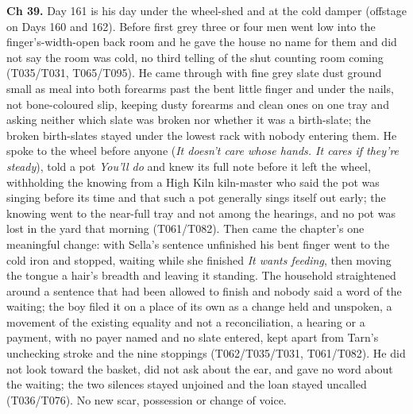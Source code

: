 \documentclass{design/chronicle}
\begin{document}
{\textbf{Ch 39.} Day 161 is his day under the wheel-shed and at the cold damper (offstage on Days 160 and 162). Before first grey three or four men went low into the finger’s-width-open back room and he gave the house no name for them and did not say the room was cold, no third telling of the shut counting room coming (T035/T031, T065/T095). He came through with fine grey slate dust ground small as meal into both forearms past the bent little finger and under the nails, not bone-coloured slip, keeping dusty forearms and clean ones on one tray and asking neither which slate was broken nor whether it was a birth-slate; the broken birth-slates stayed under the lowest rack with nobody entering them. He spoke to the wheel before anyone (\emph{It doesn’t care whose hands. It cares if they’re steady}), told a pot \emph{You’ll do} and knew its full note before it left the wheel, withholding the knowing from a High Kiln kiln-master who said the pot was singing before its time and that such a pot generally sings itself out early; the knowing went to the near-full tray and not among the hearings, and no pot was lost in the yard that morning (T061/T082). Then came the chapter’s one meaningful change: with Sella’s sentence unfinished his bent finger went to the cold iron and stopped, waiting while she finished \emph{It wants feeding}, then moving the tongue a hair’s breadth and leaving it standing. The household straightened around a sentence that had been allowed to finish and nobody said a word of the waiting; the boy filed it on a place of its own as a change held and unspoken, a movement of the existing equality and not a reconciliation, a hearing or a payment, with no payer named and no slate entered, kept apart from Tarn’s unchecking stroke and the nine stoppings (T062/T035/T031, T061/T082). He did not look toward the basket, did not ask about the ear, and gave no word about the waiting; the two silences stayed unjoined and the loan stayed uncalled (T036/T076). No new scar, possession or change of voice.

}
\end{document}
